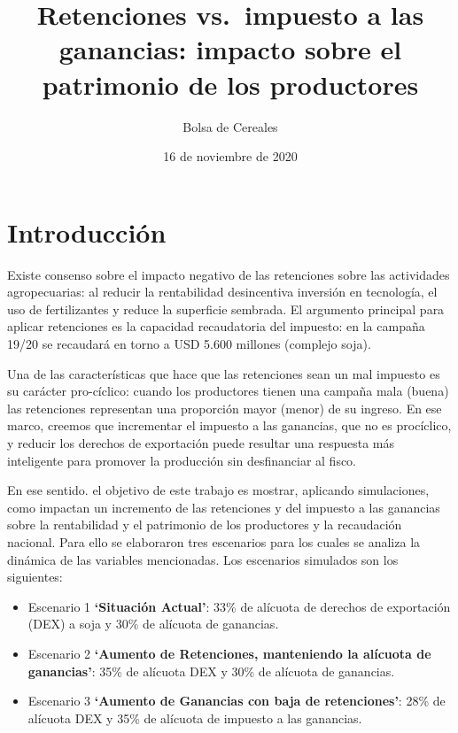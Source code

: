 \documentclass[
  12pt,
  spanish,
  10pt]{article}
\title{Retenciones vs.~impuesto a las ganancias: impacto sobre el patrimonio de
los productores}
\author{Bolsa de Cereales}
\date{16 de noviembre de 2020}
\providecommand{\tightlist}{%
  \setlength{\itemsep}{0pt}\setlength{\parskip}{0pt}}
\begin{document}
\maketitle

{
\setcounter{tocdepth}{1}
\tableofcontents
}

\hypertarget{introducciuxf3n}{%
\section{Introducción}\label{introducciuxf3n}}

Existe consenso sobre el impacto negativo de las retenciones sobre las
actividades agropecuarias: al reducir la rentabilidad desincentiva
inversión en tecnología, el uso de fertilizantes y reduce la superficie
sembrada. El argumento principal para aplicar retenciones es la
capacidad recaudatoria del impuesto: en la campaña 19/20 se recaudará en
torno a USD 5.600 millones (complejo soja).

Una de las características que hace que las retenciones sean un mal
impuesto es su carácter pro-cíclico: cuando los productores tienen una
campaña mala (buena) las retenciones representan una proporción mayor
(menor) de su ingreso. En ese marco, creemos que incrementar el impuesto
a las ganancias, que no es procíclico, y reducir los derechos de
exportación puede resultar una respuesta más inteligente para promover
la producción sin desfinanciar al fisco.

En ese sentido. el objetivo de este trabajo es mostrar, aplicando
simulaciones, como impactan un incremento de las retenciones y del
impuesto a las ganancias sobre la rentabilidad y el patrimonio de los
productores y la recaudación nacional. Para ello se elaboraron tres
escenarios para los cuales se analiza la dinámica de las variables
mencionadas. Los escenarios simulados son los siguientes:

\begin{itemize}
\tightlist
\item
  Escenario 1 \textbf{`Situación Actual'}: 33\% de alícuota de derechos
  de exportación (DEX) a soja y 30\% de alícuota de ganancias.
\item
  Escenario 2 \textbf{`Aumento de Retenciones, manteniendo la alícuota
  de ganancias'}: 35\% de alícuota DEX y 30\% de alícuota de ganancias.
\item
  Escenario 3 \textbf{`Aumento de Ganancias con baja de retenciones'}:
  28\% de alícuota DEX y 35\% de alícuota de impuesto a las ganancias.
\end{itemize}
\end{document}
